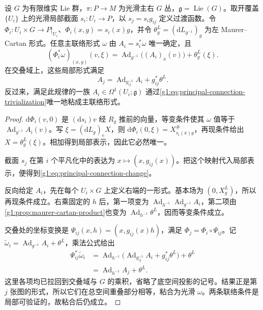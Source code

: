 \begin{theorem}\label{g1:thm:principal-connection-local-data}
	设 \(G\) 为有限维实 Lie 群，\(\pi:P\to M\) 为光滑主右 \(G\) 丛，\(\mathfrak g=\operatorname{Lie}(G)\)。取开覆盖 \(\{U_i\}\) 上的光滑局部截面 \(s_i:U_i\to P\)，以 \(s_j=s_i g_{ij}\) 定义过渡函数。令 \(\Phi_i:U_i\times G\to P|_{U_i}\)、\(\Phi_i(x,g)=s_i(x)g\)，并令 \(\theta^L_g=(\mathrm{d}L_{g^{-1}})_g\) 为左 Maurer--Cartan 形式。任意主联络形式 \(\omega\) 由 \(A_i=s_i^*\omega\) 唯一确定，且
	\begin{equation}\label{g1:eq:principal-connection-trivialization}
		(\Phi_i^*\omega)_{(x,g)}(v,\xi)
		=\operatorname{Ad}_{g^{-1}}\bigl((A_i)_x(v)\bigr)+\theta_g^L(\xi).
	\end{equation}
	在交叠域上，这些局部形式满足
	\begin{equation}\label{g1:eq:principal-connection-change}
		A_j=\operatorname{Ad}_{g_{ij}^{-1}}A_i+g_{ij}^*\theta^L.
	\end{equation}
	反过来，满足此规律的一族 \(A_i\in\Omega^1(U_i;\mathfrak g)\) 通过\eqref{g1:eq:principal-connection-trivialization}唯一地粘成主联络形式。
\end{theorem}
\begin{proof}
	\(\mathrm{d}\Phi_i(v,0)\) 是 \((\mathrm{d}s_i)v\) 经 \(R_g\) 推前的向量，等变条件使其 \(\omega\) 值等于 \(\operatorname{Ad}_{g^{-1}}A_i(v)\)。写 \(\xi=(\mathrm{d}L_g)_eX\)，则 \(\mathrm{d}\Phi_i(0,\xi)=X_{s_i(x)g}^\#\)，再现条件给出 \(X=\theta_g^L(\xi)\)。相加得到局部表示，因此它必然唯一。

	截面 \(s_j\) 在第 \(i\) 个平凡化中的表达为 \(x\mapsto(x,g_{ij}(x))\)。把这个映射代入局部表示，便得到\eqref{g1:eq:principal-connection-change}。

	反向给定 \(A_i\)，先在每个 \(U_i\times G\) 上定义右端的一形式。基本场为 \((0,X_g^L)\)，所以再现条件成立。右乘固定的 \(h\) 后，第一项变为 \(\operatorname{Ad}_{h^{-1}}\operatorname{Ad}_{g^{-1}}A_i\)，第二项由\cref{g1:prop:maurer-cartan-product}也变为 \(\operatorname{Ad}_{h^{-1}}\theta^L\)，因而等变条件成立。

	交叠处的坐标变换是 \(\Psi_{ij}(x,h)=(x,g_{ij}(x)h)\)，满足 \(\Phi_j=\Phi_i\circ\Psi_{ij}\)。记 \(\widetilde\omega_i=\operatorname{Ad}_{g^{-1}}A_i+\theta^L\)，乘法公式给出
	\begin{align*}
		\Psi_{ij}^*\widetilde\omega_i
		&=\operatorname{Ad}_{h^{-1}}\bigl(\operatorname{Ad}_{g_{ij}^{-1}}A_i+g_{ij}^*\theta^L\bigr)+\theta^L\\
		&=\operatorname{Ad}_{h^{-1}}A_j+\theta^L.
	\end{align*}
	这里各项均已拉回到交叠域与 \(G\) 的乘积，省略了底空间投影的记号。结果正是第 \(j\) 张图的形式，所以它们在总空间重叠部分相等，粘合为光滑 \(\omega\)。两条联络条件是局部可验证的，故粘合后仍成立。
\end{proof}

